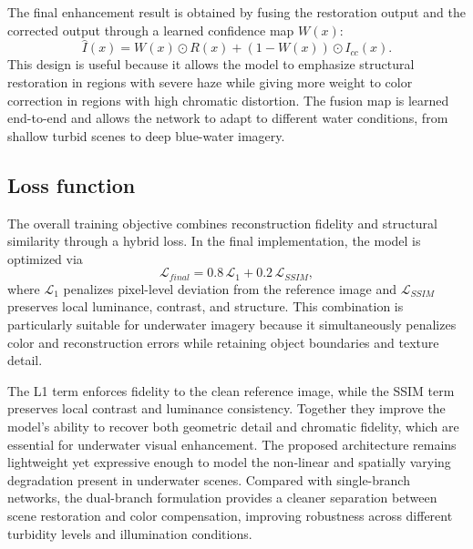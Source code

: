 The final enhancement result is obtained by fusing the restoration output and the corrected output through a learned confidence map $W(x)$:
\begin{equation}
\hat{I}(x) = W(x) \odot R(x) + (1-W(x)) \odot I_{cc}(x).
\label{eq:fusion}
\end{equation}
This design is useful because it allows the model to emphasize structural restoration in regions with severe haze while giving more weight to color correction in regions with high chromatic distortion. The fusion map is learned end-to-end and allows the network to adapt to different water conditions, from shallow turbid scenes to deep blue-water imagery.

\subsection{Loss function}

The overall training objective combines reconstruction fidelity and structural similarity through a hybrid loss. In the final implementation, the model is optimized via
\begin{equation}
\mathcal{L}_{final} = 0.8\,\mathcal{L}_{1} + 0.2\,\mathcal{L}_{SSIM},
\label{eq:loss}
\end{equation}
where $\mathcal{L}_{1}$ penalizes pixel-level deviation from the reference image and $\mathcal{L}_{SSIM}$ preserves local luminance, contrast, and structure. This combination is particularly suitable for underwater imagery because it simultaneously penalizes color and reconstruction errors while retaining object boundaries and texture detail.

The L1 term enforces fidelity to the clean reference image, while the SSIM term preserves local contrast and luminance consistency. Together they improve the model's ability to recover both geometric detail and chromatic fidelity, which are essential for underwater visual enhancement. The proposed architecture remains lightweight yet expressive enough to model the non-linear and spatially varying degradation present in underwater scenes. Compared with single-branch networks, the dual-branch formulation provides a cleaner separation between scene restoration and color compensation, improving robustness across different turbidity levels and illumination conditions.

